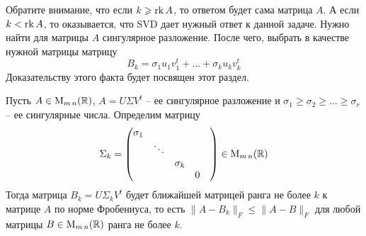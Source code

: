 Обратите внимание, что если $k \geqslant \operatorname{rk} A$, то ответом будет сама матрица $A$.
А если $k < \operatorname{rk} A$, то оказывается, что SVD дает нужный ответ к данной задаче.
Нужно найти для матрицы $A$ сингулярное разложение.
После чего, выбрать в качестве нужной матрицы матрицу
\[
B_k = \sigma_1 u_1 v_1^t + \ldots + \sigma_k u_k v_k^t
\]
Доказательству этого факта будет посвящен этот раздел.

\begin{claim}
\label{claim::LowRankApprox}
Пусть $A\in\operatorname{M}_{m\,n}(\mathbb R)$, $A = U \Sigma V^t$ -- ее сингулярное разложение и $\sigma_1\geqslant \sigma_2\geqslant \ldots \geqslant \sigma_r$ -- ее сингулярные числа.
Определим матрицу
\[
\Sigma_k =
\begin{pmatrix}
{\sigma_1}&{}&{}&{}&{}\\
{}&{\ddots}&{}&{}&{}\\
{}&{}&{\sigma_k}&{}&{}\\
{}&{}&{}&{0}&{}\\
\end{pmatrix}
\in \operatorname{M}_{m\,n}(\mathbb R)
\]
Тогда матрица $B_k = U\Sigma_k V^t$ будет ближайшей матрицей ранга не более $k$ к матрице $A$ по норме Фробениуса, то есть $\|A - B_k\|_F\leqslant \|A - B\|_F$ для любой матрицы $B\in \operatorname{M}_{m\,n}(\mathbb R)$ ранга не более $k$.
\end{claim}
